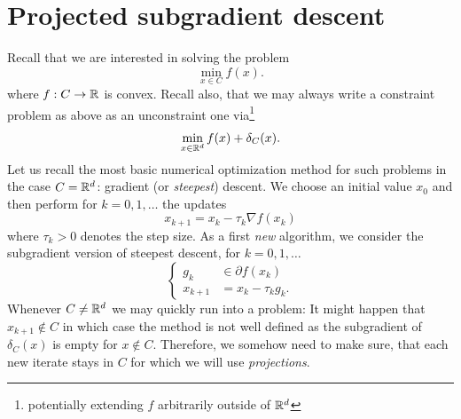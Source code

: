 \chapter{Projected subgradient descent}
Recall that we are interested in solving the problem
\begin{equation}
    \min_{x\in C} f(x).
\end{equation}
where $f:C\rightarrow\mathbb{R}$ is convex.
Recall also, that we may always write a constraint problem as above as an unconstraint one via\footnote{potentially extending $f$ arbitrarily outside of $\mathbb{R}^d$}
\begin{equation}
    \min_{x\in \mathbb{R}^d} f(x) + \delta_C(x).
\end{equation}
Let us recall the most basic numerical optimization method for such problems in the case $C=\mathbb{R}^d$: gradient (or \emph{steepest}) descent. We choose an initial value $x_0$ and then perform for $k=0,1,\dots$ the updates
\begin{equation}
    x_{k+1} = x_k-\tau_k \nabla f(x_k)
\end{equation}
where $\tau_k>0$ denotes the step size. As a first \emph{new} algorithm, we consider the subgradient version of steepest descent, for $k=0,1,\dots$
\begin{equation}
    \begin{cases}
        g_k &\in \partial f(x_k)\\
        x_{k+1} &= x_k-\tau_k g_k.
    \end{cases}
\end{equation}
Whenever $C\neq\mathbb{R}^d$ we may quickly run into a problem: It might happen that $x_{k+1}\notin C$ in which case the method is not well defined as the subgradient of $\delta_C(x)$ is empty for $x\notin C$. Therefore, we somehow need to make sure, that each new iterate stays in $C$ for which we will use \emph{projections}.

